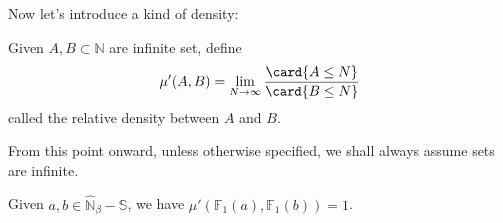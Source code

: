 Now let's introduce a kind of density:
\begin{definition}
 	Given $A, B \subset \mathbb{N}$ are infinite set, define
	\[ \mu'(A, B) = \lim_{N\to \infty}\frac{\card\{A \le N\}}{\card\{B \le N\}} \]
	called the relative density between $A$ and $B$.
\end{definition}
From this point onward, unless otherwise specified, we shall always assume sets are infinite.
\begin{theorem}
	Given $a, b\in\widehat{\mathbb{N}}_{\beta} - \mathbb{S}$, we have $\mu'(\mathbb{F}_{1}(a), \mathbb{F}_{1}(b)) = 1$.
\end{theorem}
